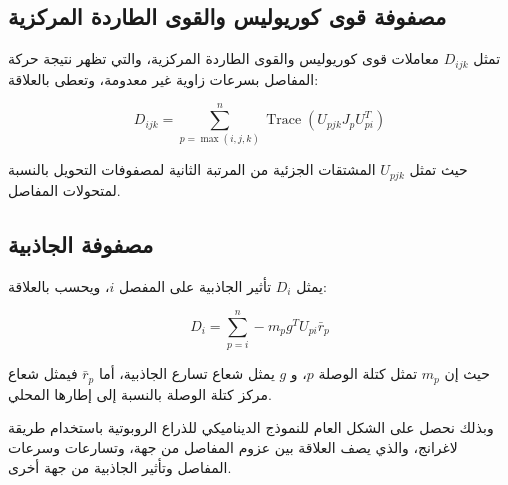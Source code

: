 \subsection{مصفوفة قوى كوريوليس والقوى الطاردة المركزية}

تمثل $D_{ijk}$ معاملات قوى كوريوليس والقوى الطاردة المركزية، والتي تظهر نتيجة حركة المفاصل بسرعات زاوية غير معدومة، وتعطى بالعلاقة:

\begin{equation}
D_{ijk} =
\sum_{p=\max(i,j,k)}^{n}
\operatorname{Trace}
\left(
U_{pjk} J_p U_{pi}^{T}
\right)
\end{equation}

حيث تمثل $U_{pjk}$ المشتقات الجزئية من المرتبة الثانية لمصفوفات التحويل بالنسبة لمتحولات المفاصل.

\subsection{مصفوفة الجاذبية}

يمثل $D_i$ تأثير الجاذبية على المفصل $i$، ويحسب بالعلاقة:

\begin{equation}
D_i =
\sum_{p=i}^{n}
- m_p g^{T} U_{pi} \bar{r}_p
\end{equation}

حيث إن $m_p$ تمثل كتلة الوصلة $p$، و $g$ يمثل شعاع تسارع الجاذبية، أما $\bar{r}_p$ فيمثل شعاع مركز كتلة الوصلة بالنسبة إلى إطارها المحلي.

وبذلك نحصل على الشكل العام للنموذج الديناميكي للذراع الروبوتية باستخدام طريقة لاغرانج، والذي يصف العلاقة بين عزوم المفاصل من جهة، وتسارعات وسرعات المفاصل وتأثير الجاذبية من جهة أخرى.


